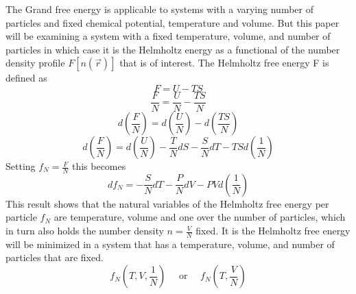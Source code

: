 \documentclass[12pt]{article}
\begin{document}
The Grand free energy is applicable to systems with a varying number of particles and fixed chemical potential, temperature and volume. But this paper will be examining a system with a fixed temperature, volume, and number of particles in which case it is the Helmholtz energy as a functional of the number density profile $F[n(\vec r)]$ that is of interest. 
The Helmholtz free energy F is defined as 
\begin{equation}F=U-TS\end{equation}
\begin{equation}\frac{F}{N}=\frac{U}{N}-\frac{TS}{N}\end{equation}
\begin{equation}\label{usetoshowmin}d\left(\frac{F}{N}\right)=d\left(\frac{U}{N}\right)-d\left(\frac{TS}{N}\right)\end{equation}
\begin{equation}d\left(\frac{F}{N}\right)=d\left(\frac{U}{N}\right)-\frac{T}{N}dS-\frac{S}{N}dT-TS d\left(\frac{1}{N}\right)\end{equation}
Setting $f_N=\frac{F}{N}$ this becomes
\begin{equation}df_N=-\frac{S}{N}dT-\frac{P}{N}dV-PVd\left(\frac{1}{N}\right)\end{equation}
This result shows that the natural variables of the Helmholtz free energy per particle $f_N$ are temperature, volume and one over the number of particles, which in turn also holds the number density $n=\frac{V}{N}$ fixed. It is the Helmholtz free energy will be minimized in a system that has a temperature, volume, and number of particles that are fixed.
\begin{equation}f_N(T,V, \frac{1}{N})\mbox{~~~~or~~~~}f_N(T,\frac{V}{N})\end{equation}
 
\end{document}

